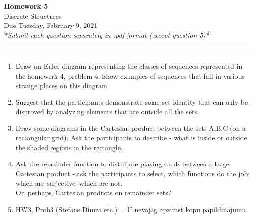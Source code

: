 \documentclass[a4paper,12pt]{article}
\begin{document}
\begin{center}
{\bf\Huge Homework 5} \\[5pt]
Discrete Structures \\
Due Tuesday, February 9, 2021\\[5pt]
\textit{*Submit each question separately in .pdf format (except question 5)*}
\end{center}

\hrule
\vspace{2pt}
\hrule
\vspace{12pt}

\begin{enumerate}

\item Draw an Euler diagram representing the classes of sequences 
represented in the homework 4, problem 4. 
Show examples of sequences that fall in various strange places on this diagram. 

\item Suggest that the participants demonstrate some set identity that
can only be disproved by analyzing elements that are outside all the sets. 

\item Draw some diagrams in the Cartesian product between the sets A,B,C
(on a rectangular grid). Ask the participants to describe - what is inside or outside the shaded regions
in the rectangle. 


\item Ask the remainder function to distribute playing cards between a larger Cartesian 
product - ask the participants to select, which functions do the job; which are surjective, 
which are not. \\
Or, perhaps, Cartesian products on remainder sets?

\item HW3, Prob3 (Stefans Dimza etc.) = {U} nevajag apzīmēt kopu papildinājumu. 


\end{enumerate}
\end{document}

